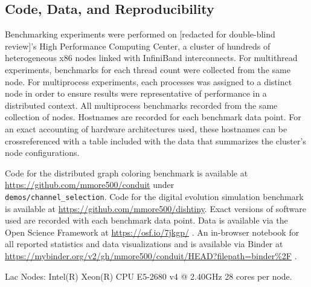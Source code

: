 \subsection{Code, Data, and Reproducibility}

Benchmarking experiments were performed on [redacted for double-blind review]'s High Performance Computing Center, a cluster of hundreds of heterogeneous x86 nodes linked with InfiniBand interconnects.
For multithread experiments, benchmarks for each thread count were collected from the same node.
For multiprocess experiments, each processes was assigned to a distinct node in order to ensure results were representative of performance in a distributed context.
All multiprocess benchmarks recorded from the same collection of nodes.
Hostnames are recorded for each benchmark data point.
For an exact accounting of hardware architectures used, these hostnames can be crossreferenced with a table included with the data that summarizes the cluster's node configurations.

Code for the distributed graph coloring benchmark is available at \url{https://github.com/mmore500/conduit} under \\ \texttt{demos/channel\_selection}.
Code for the digital evolution simulation benchmark is available at \url{https://github.com/mmore500/dishtiny}.
Exact versions of software used are recorded with each benchmark data point.
Data is available via the Open Science Framework at \url{https://osf.io/7jkgp/} \cite{foster2017open}.
An in-browser notebook for all reported statistics and data visualizations and is available via Binder at \url{https://mybinder.org/v2/gh/mmore500/conduit/HEAD?filepath=binder\%2F} \cite{jupyter2018binder}.


Lac Nodes: Intel(R) Xeon(R) CPU E5-2680 v4 @ 2.40GHz  28 cores per node.
